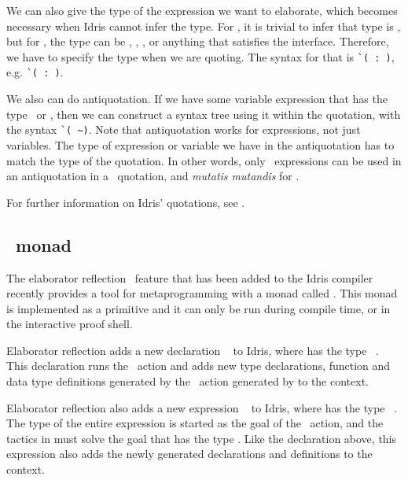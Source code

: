 We can also give the type of the expression we want to elaborate, which becomes
necessary when Idris cannot infer the type. For , it is trivial to
infer that type is , but for , the type can be ,
, , or anything that satisfies the  interface.
Therefore, we have to specify the type when we are quoting. The
syntax for that is \mbox{\texttt{\`{}( : )}},
e.g. \mbox{\texttt{\`{}( : )}}.

We also can do antiquotation. If we have some variable expression  that has the
type \TT\ or , then we can construct a syntax tree using it within the
quotation, with the syntax \mbox{\texttt{\`{}( \textasciitilde{})}}.
Note that antiquotation works for expressions, not just variables. The type of
expression or variable we have in the antiquotation has to match the type of
the quotation. In other words, only \TT\ expressions can be used in an
antiquotation in a \TT\ quotation, and \emph{mutatis mutandis} for .

For further information on Idris' quotations, see \citet{idrisQuotation}.

\subsection{\protect\Elab\ monad}

The elaborator reflection~\cite{elabref} feature that has been added to the
Idris compiler recently provides a tool for metaprogramming with a monad called
\Elab.  This monad is implemented as a primitive and it can only be run during
compile time, or in the interactive proof shell.

Elaborator reflection adds a new declaration
\texttt{}\  to Idris,
where  has the type \ \ty{()}.
This declaration runs the \Elab\ action and adds new type declarations,
function and data type definitions generated by the \Elab\ action generated by
 to the context.

Elaborator reflection also adds a new expression
\texttt{}\  to Idris,
where  has the type \ \ty{()}.
The type  of the entire expression is started as the goal of the
\Elab\ action, and the tactics in  must solve the goal
that has the type .
Like the declaration above, this expression also adds the newly generated
declarations and definitions to the context.

